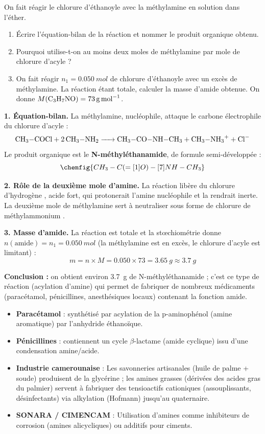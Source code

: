 \documentclass[11pt]{article}
\newcommand{\cle}[1]{{\popxbold\color{popdark}#1}}
\begin{document}
\begin{exoresolu}
On fait réagir le chlorure d'éthanoyle  avec la méthylamine  en solution dans l'éther.
\begin{enumerate}
\item Écrire l'équation-bilan de la réaction et nommer le produit organique obtenu.
\item Pourquoi utilise-t-on au moins deux moles de méthylamine par mole de chlorure d'acyle ?
\item On fait réagir $n_1 = \SI{0,050}{mol}$ de chlorure d'éthanoyle avec un excès de méthylamine. La réaction étant totale, calculer la masse d'amide obtenue. On donne $M(\ce{C3H7NO}) = \SI{73}{g.mol^{-1}}$.
\end{enumerate}
\tcblower
\textbf{1. Équation-bilan.} La méthylamine, nucléophile, attaque le carbone électrophile du chlorure d'acyle :
\[ \ce{CH3-COCl + 2 CH3-NH2 -> CH3-CO-NH-CH3 + CH3-NH3+ + Cl-} \]
Le produit organique est le \textbf{N-méthyléthanamide}, de formule semi-développée :
\[ \chemfig{CH_3-C(=[1]O)-[7]NH-CH_3} \]

\textbf{2. Rôle de la deuxième mole d'amine.} La réaction libère du chlorure d'hydrogène , acide fort, qui protonerait l'amine nucléophile et la rendrait inerte. La deuxième mole de méthylamine sert à \cle{neutraliser}  sous forme de chlorure de méthylammonium .

\textbf{3. Masse d'amide.} La réaction est totale et la st\oe chiométrie donne $n(\text{amide}) = n_1 = \SI{0,050}{mol}$ (la méthylamine est en excès, le chlorure d'acyle est limitant) :
\[ m = n \times M = \num{0,050} \times 73 = \SI{3,65}{g} \approx \SI{3,7}{g} \]

\textbf{Conclusion :} on obtient environ \SI{3,7}{g} de N-méthyléthanamide ; c'est ce type de réaction (acylation d'amine) qui permet de fabriquer de nombreux médicaments (paracétamol, pénicillines, anesthésiques locaux) contenant la fonction amide.
\end{exoresolu}

\begin{savaistu}
\begin{itemize}
\item \textbf{Paracétamol} : synthétisé par acylation de la p-aminophénol (amine aromatique) par l'anhydride éthanoïque.
\item \textbf{Pénicillines} : contiennent un cycle $\beta$-lactame (amide cyclique) issu d'une condensation amine/acide.
\item \textbf{Industrie camerounaise} : Les savonneries artisanales (huile de palme + soude) produisent de la glycérine ; les amines grasses (dérivées des acides gras du palmier) servent à fabriquer des tensioactifs cationiques (assouplissants, désinfectants) via alkylation (Hofmann) jusqu'au quaternaire.
\item \textbf{SONARA / CIMENCAM} : Utilisation d'amines comme inhibiteurs de corrosion (amines alicycliques) ou additifs pour ciments.
\end{itemize}
\end{savaistu}
\end{document}
